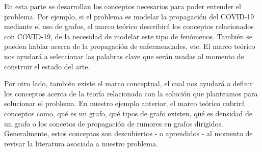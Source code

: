 En esta parte se desarrollan los conceptos necesarios para poder entender el problema. Por ejemplo, si el problema es modelar la propagación del COVID-19 mediante el uso de grafos, el marco teórico describirá los conceptos relacionados con COVID-19, de la necesidad de modelar este tipo de fenómenos. También se pueden hablar acerca de la propagación de enfermendades, etc. El marco teórico nos ayudará a seleccionar las palabras clave que serán usadas al momento de construir el estado del arte.

Por otro lado, también existe el marco conceptual, el cual nos ayudará a definir los conceptos acerca de la teoría relacionada con la solución que planteamos para solucionar el problema. En nuestro ejemplo anterior, el marco teórico cubrirá conceptos como, qué es un grafo, qué tipos de grafo existen, qué es densidad de un grafo o los concetos de propagación de rumores en grafos dirigidos. Generalmente, estos conceptos son descubiertos - o aprendidos - al momento de revisar la literatura asociada a nuestro problema.